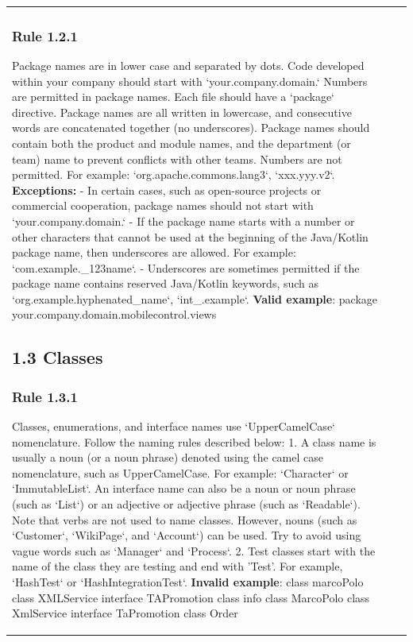 \begin{center}
\begin{tabular}{ |p{}|p{}|p{}| }
\subsubsection*{\textbf{Rule 1.2.1}}
Package names are in lower case and separated by dots. Code developed within your company should start with `your.company.domain.` Numbers are permitted in package names.
Each file should have a `package` directive.
Package names are all written in lowercase, and consecutive words are concatenated together (no underscores). Package names should contain both the product and module names, and the department (or team) name to prevent conflicts with other teams.  Numbers are not permitted. For example: `org.apache.commons.lang3`, `xxx.yyy.v2`.
\textbf{Exceptions:}
- In certain cases, such as open-source projects or commercial cooperation, package names should not start with `your.company.domain.`
- If the package name starts with a number or other characters that cannot be used at the beginning of the Java/Kotlin package name, then underscores are allowed. For example: `com.example._123name`.
- Underscores are sometimes permitted if the package name contains reserved Java/Kotlin keywords, such as `org.example.hyphenated_name`, `int_.example`.
\textbf{Valid example}:
package your.company.domain.mobilecontrol.views
\subsection*{\textbf{1.3 Classes}}
\subsubsection*{\textbf{Rule 1.3.1}}
Classes, enumerations, and interface names use `UpperCamelCase` nomenclature. Follow the naming rules described below:
1.	A class name is usually a noun (or a noun phrase) denoted using the camel case nomenclature, such as UpperCamelCase. For example: `Character` or `ImmutableList`.
An interface name can also be a noun or noun phrase (such as `List`) or an adjective or adjective phrase (such as `Readable`).
Note that verbs are not used to name classes. However, nouns (such as `Customer`, `WikiPage`, and `Account`) can be used. Try to avoid using vague words such as `Manager` and `Process`.
2.	Test classes start with the name of the class they are testing and end with 'Test'. For example, `HashTest` or `HashIntegrationTest`.
\textbf{Invalid example}:
class marcoPolo {}
class XMLService {}
interface TAPromotion {}
class info {}
class MarcoPolo {}
class XmlService {}
interface TaPromotion {}
class Order {}

\end{tabular}
\end{center}
